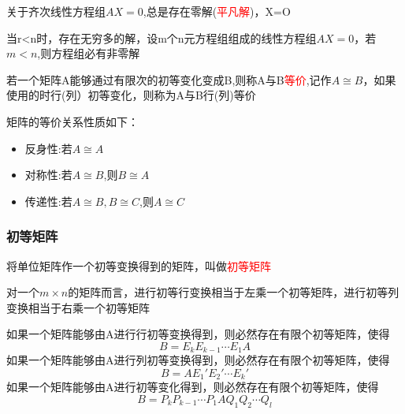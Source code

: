 
关于齐次线性方程组$AX=0$,总是存在零解(\textcolor{red}{平凡解})，X=O


当r<n时，存在无穷多的解，设m个n元方程组组成的线性方程组$AX=0$，若$m<n$,则方程组必有非零解


若一个矩阵A能够通过有限次的初等变化变成B,则称A与B\textcolor{red}{等价},记作$A\cong B$，如果使用的时行(列）初等变化，则称为A与B行(列)等价

矩阵的等价关系性质如下：

\begin{itemize}
    \item {反身性:若$A\cong A$}
    \item {对称性:若$A\cong B$,则$B\cong A$}
    \item {传递性:若$A\cong B,B\cong C$,则$A\cong C$}
\end{itemize}

\subsubsection{初等矩阵}


将单位矩阵作一个初等变换得到的矩阵，叫做\textcolor{red}{初等矩阵}

对一个$m\times n$的矩阵而言，进行初等行变换相当于左乘一个初等矩阵，进行初等列变换相当于右乘一个初等矩阵

\begin{note}
    如果一个矩阵能够由A进行行初等变换得到，则必然存在有限个初等矩阵，使得
$$
B=E_kE_{k-1}\cdots E_1A
$$
如果一个矩阵能够由A进行列初等变换得到，则必然存在有限个初等矩阵，使得
$$
B=AE_1'E_2'\cdots E_k'
$$
如果一个矩阵能够由A进行初等变化得到，则必然存在有限个初等矩阵，使得
$$
B=P_kP_{k-1}\cdots P_1 A Q_1Q_2\cdots Q_l
$$
\end{note}

